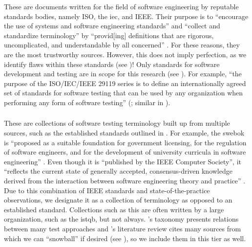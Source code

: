 These are documents written for the field of software engineering by reputable
standards bodies, namely ISO, the \acf{iec}, and IEEE. Their purpose is to
``encourage the use of systems and software engineering standards'' and
``collect and standardize terminology'' by ``provid[ing] definitions that are
rigorous, uncomplicated, and understandable by all concerned''
\citep[p.~viii]{IEEE2017}. For these reasons, they
are the most trustworthy sources. However, this does not imply perfection, as we
identify  %
flaws within these standards (see )!
Only standards for software development and testing are in scope for
this research (see ). For example, ``the purpose of the
ISO/IEC/IEEE 29119 series is to define an internationally agreed set of
standards for software testing that can be used by any organization when
performing any form of software testing''
\ifnotpaper(\fi\citeyear[p.~vii]{IEEE2022}\ifnotpaper; similar in
\citeyear[p.~ix]{IEEE2016})\fi.

\subsubsection{}
\label{metas}

These are collections of software testing terminology built up from multiple
sources, such as the established standards outlined in . For
example, the \acs{swebok} is ``proposed as a
suitable foundation for government licensing, for the regulation of software
engineers, and for the development of university curricula in software
engineering'' \citep[p.~xix]{KanerEtAl2011}. Even though it is ``published by
the IEEE Computer Society'', it ``reflects the current state of generally
accepted, consensus-driven knowledge derived from the interaction between
software engineering theory and practice'' \citep{AboutSWEBOK}. Due to this
combination of IEEE standards and state-of-the-practice observations, we
designate it as a collection of terminology as opposed to an established
standard. Collections such as this are often written by a large
organization, such as the \acf{istqb}, but not always.
\citet{Firesmith2015}'s taxonomy presents relations between many
test approaches and \citet{DoğanEtAl2014}'s literature
review cites many sources from which we can ``snowball'' if desired
(see ), so we include them in this tier as well.

\subsubsection{}
\label{texts}


